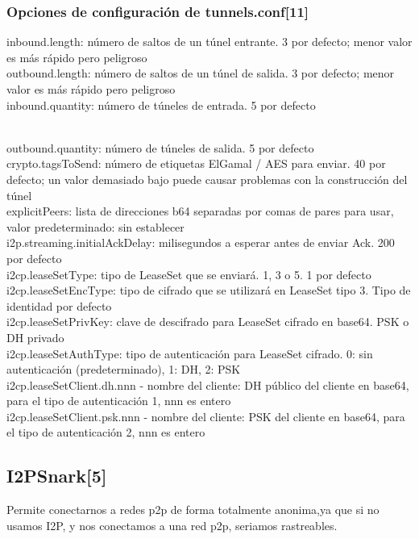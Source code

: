 \documentclass{article}
\begin{document}
\subsubsection{Opciones de configuración de tunnels.conf[11]}
inbound.length: número de saltos de un túnel entrante. 3 por defecto; menor valor es más rápido pero peligroso
\\

outbound.length: número de saltos de un túnel de salida. 3 por defecto; menor valor es más rápido pero peligroso
\\

inbound.quantity: número de túneles de entrada. 5 por defecto

\\
outbound.quantity: número de túneles de salida. 5 por defecto
\\

crypto.tagsToSend: número de etiquetas ElGamal / AES para enviar. 40 por defecto; un valor demasiado bajo puede causar problemas con la construcción del túnel
\\

explicitPeers: lista de direcciones b64 separadas por comas de pares para usar, valor predeterminado: sin establecer
\\

i2p.streaming.initialAckDelay: milisegundos a esperar antes de enviar Ack. 200 por defecto
\\

i2cp.leaseSetType: tipo de LeaseSet que se enviará. 1, 3 o 5. 1 por defecto
\\

i2cp.leaseSetEncType: tipo de cifrado que se utilizará en LeaseSet tipo 3. Tipo de identidad por defecto
\\

i2cp.leaseSetPrivKey: clave de descifrado para LeaseSet cifrado en base64. PSK o DH privado
\\

i2cp.leaseSetAuthType: tipo de autenticación para LeaseSet cifrado. 0: sin autenticación (predeterminado), 1: DH, 2: PSK
\\

i2cp.leaseSetClient.dh.nnn - nombre del cliente: DH público del cliente en base64, para el tipo de autenticación 1, nnn es entero
\\

i2cp.leaseSetClient.psk.nnn - nombre del cliente: PSK del cliente en base64, para el tipo de autenticación 2, nnn es entero 
\subsection{I2PSnark[5]}
Permite conectarnos a redes p2p de forma totalmente anonima,ya que si no usamos I2P, y nos conectamos a una red p2p, seriamos rastreables.
\\
\end{document}
